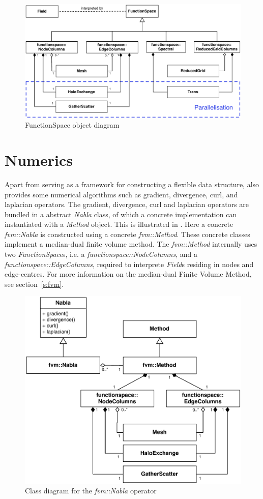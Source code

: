 \begin{figure}
\centering
\includegraphics[width=\textwidth]{imgs/functionspace.pdf}
\caption{FunctionSpace object diagram \label{fig:functionspace}}
\end{figure}
%
\section{Numerics}
%
Apart from serving as a framework for constructing a flexible data structure,
\Atlas also provides some numerical algorithms such as gradient, divergence,
curl, and laplacian operators.
%
The gradient, divergence, curl and laplacian operators are bundled in a
abstract \emph{Nabla} class, of which a concrete implementation can
instantiated with a \emph{Method} object. This is illustrated in
. Here a concrete \emph{fvm::Nabla} is constructed using a
concrete \emph{fvm::Method}. These concrete classes implement a median-dual
finite volume method. The \emph{fvm::Method} internally uses two
\emph{FunctionSpace}s, i.e. a \emph{functionspace::NodeColumns}, and a
\emph{functionspace::EdgeColumns}, required to interprete \emph{Field}s
residing in nodes and edge-centres. For more information on the median-dual
Finite Volume Method, see section~\ref{s:fvm}.
%
\begin{figure}
\centering
\includegraphics[scale=0.5]{imgs/numerics.pdf}
\caption{Class diagram for the \emph{fvm::Nabla} operator
\label{fig:numerics}}
\end{figure}
%
